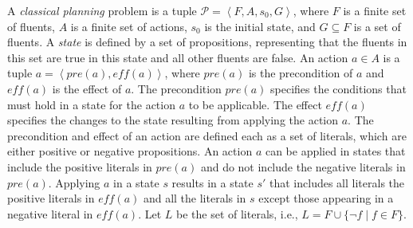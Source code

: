 \documentclass[letterpaper]{article} %
\newcommand{\pre}{\ensuremath{\textit{pre}}\xspace}
\newcommand{\eff}{\ensuremath{\textit{eff}}\xspace}
\newcommand{\tuple}[1]{\ensuremath{\left \langle #1 \right \rangle }}
\newif\ifaddcomments
\newcommand{\roni}[1]{\ifaddcomments{\textcolor{red}{[Roni: #1]}}\fi}
\begin{document}
A \emph{classical planning} problem is a tuple $\mathcal{P} = \tuple{F, A, s_0, G}$, where $F$ is a finite set of fluents, $A$ is a finite set of actions, $s_0$ is the initial state, and $G\subseteq F$ is a set of fluents. 
A \emph{state} is defined by a set of propositions, representing that the fluents in this set are true in this state and all other fluents are false. 
An action $a\in A$ is a tuple $a = \tuple{\mathit{pre}(a), \mathit{eff}(a)}$, where $\mathit{pre}(a)$ is the precondition of $a$ and $\mathit{eff}(a)$ is the effect of $a$. 
The precondition $\mathit{pre}(a)$ specifies the conditions that must hold in a state for the action $a$ to be applicable. The effect $\mathit{eff}(a)$ specifies the changes to the state resulting from applying the action $a$.   
The precondition and effect of an action are defined each as a set of literals, which are either positive or negative propositions. 
An action $a$ can be applied in states that include the positive literals in 
$\pre(a)$ and do not include the negative literals in 
$\pre(a)$. 
Applying $a$ in a state $s$ results in a state $s'$ that includes all literals the positive literals in $\eff(a)$ and all the literals in $s$ except those appearing in a negative literal in $\eff(a)$. 
Let $L$ be the set of literals, i.e., 
$L = F \cup \{\neg f \mid f\in F\}$.
\end{document}
